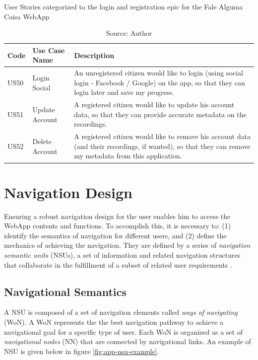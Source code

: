\begin{table}[h]
\caption{User Stories categorized to the login and registration epic for the Fale Alguma Coisa WebApp}
\label{tab:falealgumacoisa-simplified-login-and-registration}
\centering
\begin{tabular}{|p{1cm}|p{3cm}|p{10cm}|}
\hline
    Code & Use Case Name & Description \\ \hline
    US50 & Login Social & An unregistered citizen would like to login (using social login - Facebook / Google) on the app, so that they can login later and save my progress. \\ \hline
    US51 & Update Account & A registered citizen would like to update his account data, so that they can provide accurate metadata on the recordings. \\ \hline
    US52 & Delete Account & A registered citizen would like to remove his account data (and their recordings, if wanted), so that they can remove my metadata from this application. \\ \hline
\end{tabular}
\caption*{Source: Author}
\end{table}

\section{Navigation Design}
\label{sec:navigation-design}

Ensuring a robust navigation design for the user enables him to access the WebApp contents and functions. To accomplish this, it is necessary to: (1) identify the semantics of navigation for different users, and (2) define the mechanics of achieving the navigation. They are defined by a series of \textit{navigation semantic units} (NSUs), a set of information and related navigation structures that collaborate in the fulfillment of a subset of related user requirements \cite{conallen2003building}.

\subsection{Navigational Semantics}

A NSU is composed of a set of navigation elements called \textit{ways of navigating} (WoN). A WoN represents the the best navigation pathway to achieve a navigational goal for a specific type of user. Each WoN is organized as a set of \textit{navigational nodes} (NN) that are connected by navigational links. An example of NSU is given below in figure \ref{fig:app-nsu-example}.

